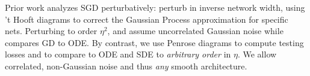         
            Prior work analyzes SGD perturbatively: \cite{dy19} perturb in
            inverse network width, using 't Hooft diagrams to correct the
            Gaussian Process approximation for specific nets.  Perturbing
            to order $\eta^2$, \cite{ch18} and \cite{li17} assume uncorrelated
            Gaussian noise while \cite{ba21} compares GD to ODE.
            By contrast, we use Penrose diagrams \cite{pe71} to compute
            testing losses and to compare to ODE and SDE to \emph{arbitrary
            order} in $\eta$.  
            We allow correlated,
            non-Gaussian noise and thus \emph{any} smooth architecture.

